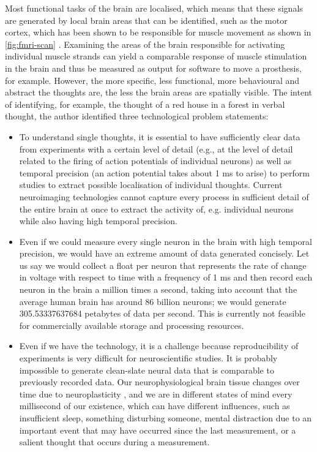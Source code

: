 Most functional tasks of the brain are localised, which means that these signals are generated by local brain areas that can be identified, such as the motor cortex, which has been shown to be responsible for muscle movement as shown in \autoref{fig:fmri-scan} \citep{rashid_bilateral_2018}. Examining the areas of the brain responsible for activating individual muscle strands can yield a comparable response of muscle stimulation in the brain and thus be measured as output for software to move a prosthesis, for example. However, the more specific, less functional, more behavioural and abstract the thoughts are, the less the brain areas are spatially visible. The intent of identifying, for example, the thought of a red house in a forest in verbal thought, the author identified three technological problem statements:

\begin{itemize}
  \item To understand single thoughts, it is essential to have sufficiently clear data from experiments with a certain level of detail (e.g., at the level of detail related to the firing of action potentials of individual neurons) as well as temporal precision (an action potential takes about 1 ms to arise) to perform studies to extract possible localisation of individual thoughts. Current neuroimaging technologies cannot capture every process in sufficient detail of the entire brain at once to extract the activity of, e.g. individual neurons while also having high temporal precision.
  \item Even if we could measure every single neuron in the brain with high temporal precision, we would have an extreme amount of data generated concisely. Let us say we would collect a float per neuron that represents the rate of change in voltage with respect to time with a frequency of 1 ms and then record each neuron in the brain a million times a second, taking into account that the average human brain has around 86 billion neurons; we would generate 305.53337637684 petabytes of data per second. This is currently not feasible for commercially available storage and processing resources.
  \item Even if we have the technology, it is a challenge because reproducibility of experiments is very difficult for neuroscientific studies. It is probably impossible to generate clean-slate neural data that is comparable to previously recorded data. Our neurophysiological brain tissue changes over time due to neuroplasticity \citep{puderbaugh_neuroplasticity_2022}, and we are in different states of mind every millisecond of our existence, which can have different influences, such as insufficient sleep, something disturbing someone, mental distraction due to an important event that may have occurred since the last measurement, or a salient thought that occurs during a measurement.
\end{itemize}

